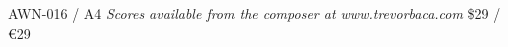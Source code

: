 \documentclass{article}
\begin{document}
\null \vfill

AWN-016 / A4 \hfill
\textit{Scores available from the composer at www.trevorbaca.com}
\hfill \$29 / \euro 29
\end{document}
